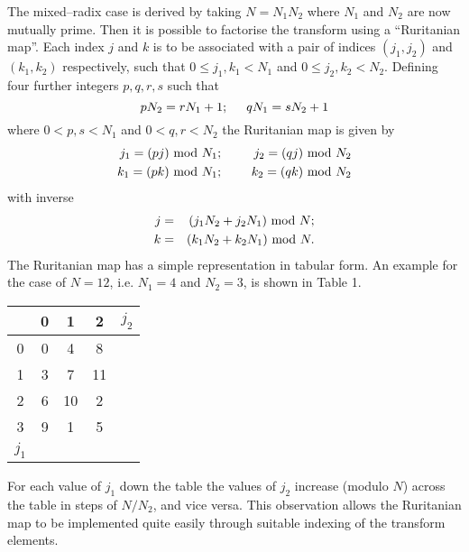 \documentclass[dvips]{article}
\begin{document}
The mixed--radix case is derived by taking
$N=N_{1}N_{2}$ where $N_{1}$ and $N_{2}$ are now mutually prime.  Then
it is possible to factorise the transform using a ``Ruritanian map''.  
Each index $j$ and $k$ is to be associated with a pair of indices
$(j_{1},j_{2})$ and $(k_{1},k_{2})$ respectively, such that
$0\leq j_{1},k_{1}< N_{1}$ and $0\leq j_{2},k_{2}< N_{2}$.
Defining four further integers $p,q,r,s$ such that
\[
pN_{2} = rN_{1} + 1;\hspace{5mm} qN_{1} = sN_{2} + 1
\]
where  $0<p,s<N_{1}$ and $0< q,r <N_{2}$ the Ruritanian map is given by
\begin{eqnarray}
j_{1} = (pj)\ {\rm mod}\ N_{1}; & & \hspace{5mm}
j_{2} = (qj)\ {\rm mod}\ N_{2} \nonumber \\
k_{1} = (pk)\ {\rm mod}\ N_{1}; & & \hspace{5mm}
k_{2} = (qk)\ {\rm mod}\ N_{2} \nonumber
\end{eqnarray}
with inverse
\begin{eqnarray}
j & = & (j_{1}N_{2} + j_{2}N_{1})\ {\rm mod}\ N; \nonumber\\ 
k & = & (k_{1}N_{2} + k_{2}N_{1})\ {\rm mod}\ N.
\label{RURINV}
\end{eqnarray}
The Ruritanian map has a simple representation in tabular form.  An
example for the case of $N=12$, i.e. $N_{1}=4$ and $N_{2}=3$, is shown in
Table 1.
\begin{table}[h]
\begin{center}
\begin{tabular}{c|cccc}
  & 0 & 1 & 2 & $j_{2}$ \\ \hline
0 & 0 & 4 & 8 & \\ 
1 & 3 & 7 & 11 & \\
2 & 6 & 10 & 2 & \\
3 & 9 & 1 & 5 & \\
$j_{1}$ &   &   & & \\  
\end{tabular}
\end{center}
\end{table}
For each value of $j_{1}$ down the table the values of $j_{2}$ increase
(modulo $N$) across the table in steps of $N/N_{2}$, and vice versa.
This observation allows the Ruritanian map to be implemented quite easily
through suitable indexing of the transform elements.
\end{document}
